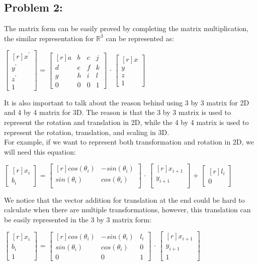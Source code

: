 \documentclass[11pt]{article}
\newcommand{\mat}[1]{
    $\begin{bmatrix*}[r]
        #1
    \end{bmatrix*}$
} %
\begin{document}
\subsection{Problem 2:}
The matrix form can be easily proved by completing the matrix multiplication, the similar representation for $\mathbb{R}^3$ can be represented as:
\begin{center}
  \mat{
    x^{'} \\
    y^{'} \\
    z^{'} \\
    1
  } = \mat{
    a & b & c & j \\
    d & e & f & k \\
    g & h & i & l \\
    0 & 0 & 0 & 1
  } $\cdot$ \mat{
    x \\
    y \\
    z \\
    1
  }
\end{center}
It is also important to talk about the reason behind using 3 by 3 matrix for 2D and 4 by 4 matrix for 3D. The reason is that the 3 by 3 matrix is used to represent the rotation and translation in 2D, while the 4 by 4 matrix is used to represent the rotation, translation, and scaling in 3D. \\
For example, if we want to represent both transformation and rotation in 2D, we will need this equation:
\begin{center}
  \mat{
    x_i \\
    b_i
  } = \mat{
    cos(\theta_i) & -sin(\theta_i)  \\
    sin(\theta_i) & cos(\theta_i) \\
  } $\cdot$ \mat{
    x_{i+1} \\
    y_{i+1} \\
  } + \mat{
    l_i \\
    0
  }
\end{center}
We notice that the vector addition for translation at the end could be hard to calculate when there are multiple transformations, however, this translation can be easily represented in the 3 by 3 matrix form:
\begin{center}
  \mat{
    x_i \\
    b_i \\
    1
  } = \mat{
    cos(\theta_i) & -sin(\theta_i) & l_i \\
    sin(\theta_i) & cos(\theta_i) & 0 \\
    0 & 0 & 1
  } $\cdot$ \mat{
    x_{i+1} \\
    y_{i+1} \\
    1
  }
\end{center}
\end{document}
